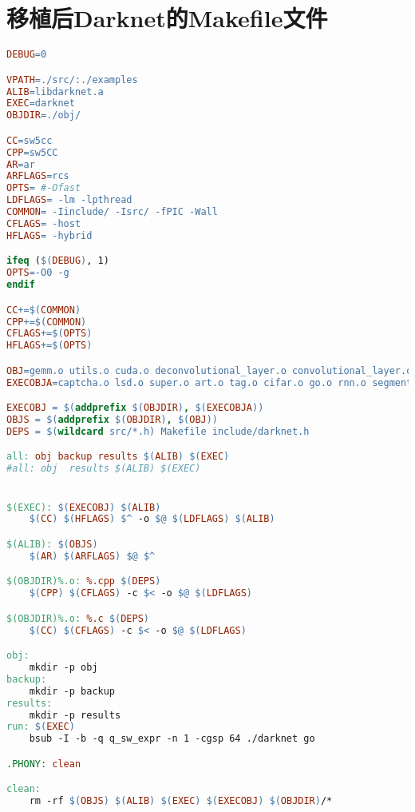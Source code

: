 \chapter{移植后Darknet的Makefile文件}\label{apdx:移植后Darknet的Makefile文件}
\begin{lstlisting}[language=make]
DEBUG=0

VPATH=./src/:./examples
ALIB=libdarknet.a
EXEC=darknet
OBJDIR=./obj/

CC=sw5cc
CPP=sw5CC
AR=ar
ARFLAGS=rcs
OPTS= #-Ofast
LDFLAGS= -lm -lpthread
COMMON= -Iinclude/ -Isrc/ -fPIC -Wall
CFLAGS= -host
HFLAGS= -hybrid

ifeq ($(DEBUG), 1) 
OPTS=-O0 -g
endif

CC+=$(COMMON)
CPP+=$(COMMON)
CFLAGS+=$(OPTS)
HFLAGS+=$(OPTS)

OBJ=gemm.o utils.o cuda.o deconvolutional_layer.o convolutional_layer.o list.o image.o activations.o im2col.o col2im.o blas.o crop_layer.o dropout_layer.o maxpool_layer.o softmax_layer.o data.o matrix.o network.o connected_layer.o cost_layer.o parser.o option_list.o detection_layer.o route_layer.o upsample_layer.o box.o normalization_layer.o avgpool_layer.o layer.o local_layer.o shortcut_layer.o logistic_layer.o activation_layer.o rnn_layer.o gru_layer.o crnn_layer.o demo.o batchnorm_layer.o region_layer.o reorg_layer.o tree.o  lstm_layer.o l2norm_layer.o yolo_layer.o iseg_layer.o image_opencv.o
EXECOBJA=captcha.o lsd.o super.o art.o tag.o cifar.o go.o rnn.o segmenter.o regressor.o classifier.o coco.o yolo.o detector.o nightmare.o instance-segmenter.o darknet.o

EXECOBJ = $(addprefix $(OBJDIR), $(EXECOBJA))
OBJS = $(addprefix $(OBJDIR), $(OBJ))
DEPS = $(wildcard src/*.h) Makefile include/darknet.h

all: obj backup results $(ALIB) $(EXEC)
#all: obj  results $(ALIB) $(EXEC)


$(EXEC): $(EXECOBJ) $(ALIB)
	$(CC) $(HFLAGS) $^ -o $@ $(LDFLAGS) $(ALIB)

$(ALIB): $(OBJS)
	$(AR) $(ARFLAGS) $@ $^

$(OBJDIR)%.o: %.cpp $(DEPS)
	$(CPP) $(CFLAGS) -c $< -o $@ $(LDFLAGS)

$(OBJDIR)%.o: %.c $(DEPS)
	$(CC) $(CFLAGS) -c $< -o $@ $(LDFLAGS)

obj:
	mkdir -p obj
backup:
	mkdir -p backup
results:
	mkdir -p results
run: $(EXEC)
	bsub -I -b -q q_sw_expr -n 1 -cgsp 64 ./darknet go

.PHONY: clean

clean:
	rm -rf $(OBJS) $(ALIB) $(EXEC) $(EXECOBJ) $(OBJDIR)/*
\end{lstlisting}